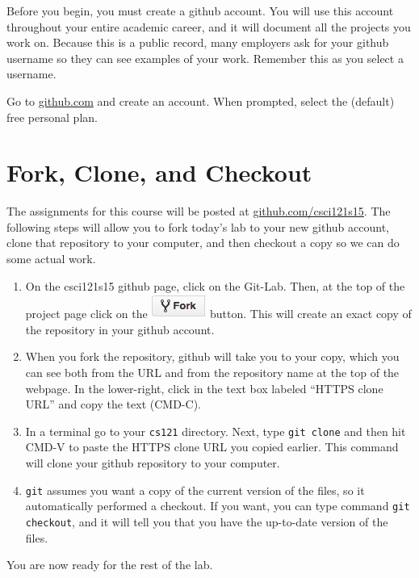 \documentclass[11pt]{article}
\begin{document}
Before you begin, you must create a github account.  You will use this account throughout your entire academic career, and it will document all the projects you work on.  Because this is a public record, many employers ask for your github username so they can see examples of your work.  Remember this as you select a username.

Go to \url{github.com} and create an account.  When prompted, select the (default) free personal plan.

\section*{Fork, Clone, and Checkout}

The assignments for this course will be posted at \url{github.com/csci121s15}.  The following steps will allow you to fork today's lab to your new github account, clone that repository to your computer, and then checkout a copy so we can do some actual work.

\begin{enumerate}
\item On the csci121s15 github page, click on the Git-Lab.  Then, at the top of the project page click on the \includegraphics[scale=.5]{fork} button.  This will create an exact copy of the repository in your github account.

\item When you fork the repository, github will take you to your copy, which you can see both from the URL and from the repository name at the top of the webpage.  In the lower-right, click in the text box labeled ``HTTPS clone URL'' and copy the text (CMD-C).

\item In a terminal go to your {\tt cs121} directory.  Next, type {\tt git clone} and then hit CMD-V to paste the HTTPS clone URL you copied earlier.  This command will clone your github repository to your computer.

\item {\tt git} assumes you want a copy of the current version of the files, so it automatically performed a checkout.  If you want, you can type command {\tt git checkout}, and it will tell you that you have the up-to-date version of the files.
\end{enumerate}

You are now ready for the rest of the lab.
\end{document}
